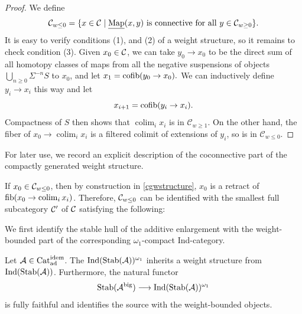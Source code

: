 \documentclass[a4paper,10pt, oneside]{amsart}
\begin{document}
\begin{proof}
	We define %
	$$
	\mathcal{C}_{w \leq 0}=\{x \in \mathcal{C}\mid \underline{\operatorname{Map}}(x, y) \text { is connective for all } y \in \mathcal{C}_{w \geq 0}\} .
	$$
	It is easy to verify conditions (1), and (2) of a weight structure, so it remains to check condition (3). Given $x_0\in\mathcal{C}$, we can take $y_0 \rightarrow x_0$ to be the direct sum of all homotopy classes of maps from all the negative suspensions of objects $\bigcup_{n\geq0} \Sigma^{-n}S$ to $x_0$, and let $x_1=\mathrm{cofib}(y_0\to x_0).$
	We can inductively define $y_i \rightarrow x_i$ this way and let $$x_{i+1}=\mathrm{cofib}(y_i\to x_i).$$ Compactness of $S$ then shows that $\operatorname{colim}_i x_i$ is in $\mathcal{C}_{w \geq 1}$. On the other hand, the fiber of $x_0 \rightarrow  \operatorname{colim}_i x_i$ is a filtered colimit of extensions of $y_i$, so is in $\mathcal{C}_{w\leq 0}$.
\end{proof}
For later use, we record an explicit description of the coconnective part of
the compactly generated weight structure.
\begin{rem}\label{wleqgen}
	If $x_0\in \mathcal{C}_{w\leq0}$, then by construction in \cref{cgwstructure}, $x_0$ is a retract of $\mathrm{fib}(x_0 \rightarrow  \operatorname{colim}_i x_i)$. Therefore, $\mathcal{C}_{w\leq0}$ can be identified with the smallest full subcategory $\mathcal{C}'$ of $\mathcal{C}$ satisfying the following:
\end{rem}
We first identify the stable hull of the additive enlargement with the
weight-bounded part of the corresponding \(\omega_1\)-compact Ind-category.
\begin{lem}\label{calklem1}
 Let $\mathcal{A}\in\mathrm{Cat}_{\mathrm{ad}}^{\mathrm{idem}}$. The \infcat \(\mathrm{Ind}(\mathrm{Stab}(\mathcal{A}))^{\omega_1}\) inherits a weight structure from $\mathrm{Ind}(\mathrm{Stab}(\mathcal{A}))$. Furthermore, the natural functor
	\[
	\mathrm{Stab}(\mathcal{A}^{\mathrm{big}})\longrightarrow \mathrm{Ind}(\mathrm{Stab}(\mathcal{A}))^{\omega_1}
	\]
	is fully faithful and identifies the source with the weight-bounded objects.
\end{lem}  
\end{document}
